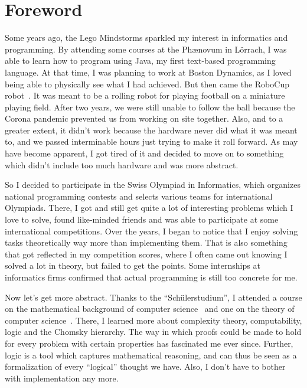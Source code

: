 \chapter*{Foreword}

Some years ago, the Lego Mindstorms sparkled my interest in informatics and programming.
By attending some courses at the Ph\ae novum in Lörrach, I was able to learn how to program using Java, my first text-based programming language.
At that time, I was planning to work at Boston Dynamics, as I loved being able to physically see what I had achieved.
But then came the RoboCup robot~\cite{roboCup}.
It was meant to be a rolling robot for playing football on a miniature playing field.
After two years, we were still unable to follow the ball because the Corona pandemic prevented us from working on site together.
Also, and to a greater extent, it didn't work because the hardware never did what it was meant to, and we passed interminable hours just trying to make it roll forward.
As may have become apparent, I got tired of it and decided to move on to something which didn't include too much hardware and was more abstract.

So I decided to participate in the Swiss Olympiad in Informatics, which organizes national programming contests and selects various teams for international Olympiads.
There, I got and still get quite a lot of interesting problems which I love to solve, found like-minded friends and was able to participate at some international competitions.
Over the years, I began to notice that I enjoy solving tasks theoretically way more than implementing them.
That is also something that got reflected in my competition scores, where I often came out knowing I solved a lot in theory, but failed to get the points.
Some internships at informatics firms confirmed that actual programming is still too concrete for me.

Now let's get more abstract.
Thanks to the ``Schülerstudium'', I attended a course on the mathematical background of computer science~\cite{discrete-maths} and one on the theory of computer science~\cite{theory-cs}.
There, I learned more about complexity theory, computability, logic and the Chomsky hierarchy.
The way in which proofs could be made to hold for every problem with certain properties has fascinated me ever since.
Further, logic is a tool which captures mathematical reasoning, and can thus be seen as a formalization of every ``logical'' thought we have.
Also, I don't have to bother with implementation any more.

